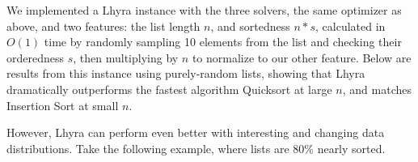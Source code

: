 \documentclass[11pt]{article}
\begin{document}
We implemented a Lhyra instance with the three solvers, the same optimizer as above, and two features: the list length $n$, and sortedness $n*s$, calculated in $O(1)$ time by randomly sampling 10 elements from the list and checking their orderedness $s$, then multiplying by $n$ to normalize to our other feature.  Below are results from this instance using purely-random lists, showing that Lhyra dramatically outperforms the fastest algorithm Quicksort at large $n$, and matches Insertion Sort at small $n$.

\begin{figure}[!ht]
    \centering
    \begin{floatrow}
      
    \end{floatrow}
\end{figure}

However, Lhyra can perform even better with interesting and changing data distributions.  Take the following example, where lists are 80\% nearly sorted.
\end{document}
